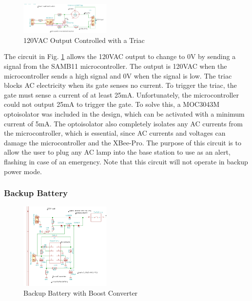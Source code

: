 \documentclass[journal,compsoc]{IEEEtran}
\begin{document}
\begin{figure}[ht]	%
\centering
\includegraphics[width=0.4\textwidth]{Triac.png}
\caption{ 120VAC Output Controlled with a Triac}
\label{PTriac}
\end{figure}

The circuit in Fig. \ref{PTriac} allows the 120VAC output to change to 0V by sending a signal from the SAMB11 microcontroller.  The output is 120VAC when the microcontroller sends a high signal and 0V when the signal is low.  The triac blocks AC electricity when its gate senses no current.  To trigger the triac, the gate must sense a current of at least 25mA.  Unfortunately, the microcontroller could not output 25mA to trigger the gate.  To solve this, a MOC3043M optoisolator was included in the design, which can be activated with a minimum current of 5mA.  The optoisolator also completely isolates any AC currents from the microcontroller, which is essential, since AC currents and voltages can damage the microcontroller and the XBee-Pro.  The purpose of this circuit is to allow the user to plug any AC lamp into the base station to use as an alert, flashing in case of an emergency.  Note that this circuit will not operate in backup power mode.

\subsubsection{Backup Battery}

\begin{figure}[ht]	%
\centering
\includegraphics[width=0.4\textwidth]{Boost.png}
\caption{Backup Battery with Boost Converter}
\label{Pboost}
\end{figure}
\end{document}
